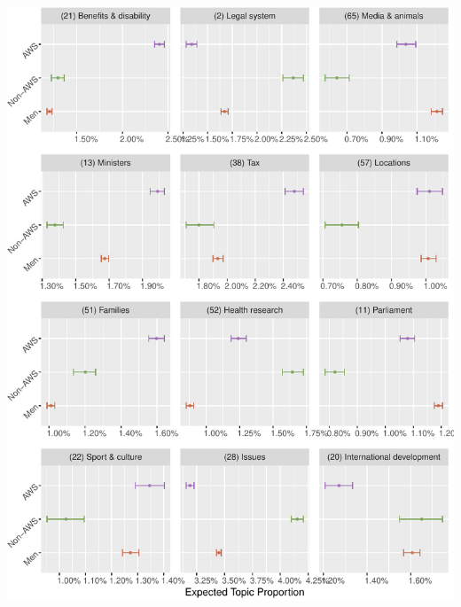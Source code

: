 \documentclass[]{article}
\let\origfigure\figure
\let\endorigfigure\endfigure
\renewenvironment{figure}[1][2] {
    \expandafter\origfigure\expandafter[H]
} {
    \endorigfigure
}
\theoremstyle{definition}
\theoremstyle{definition}
\theoremstyle{definition}
\theoremstyle{remark}
\begin{document}
\begin{figure}
\centering
\includegraphics{methodology_files/figure-latex/p-effect1-1.pdf}
\caption{\label{fig:p-effect1}Where AWS MPs are most distinct from non-AWS
female MPs}
\end{figure}
\end{document}
